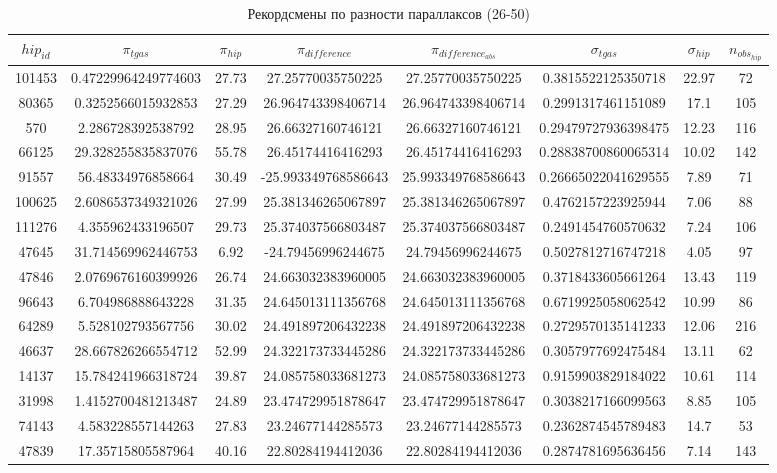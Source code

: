 \documentclass[14pt]{article} %
\begin{document}
\begin{landscape}
\begin{spacing}{1.0}
\begin{table}[h]
\caption{Рекордсмены по разности параллаксов (26-50)}
\label{tabular:75_50}
\begin{tabular}{|c|c|c|c|c|c|c|c|}
\hline 	
$hip_{id}$ &$\pi_{tgas}$ &$\pi_{hip}$ &$\pi_{difference}$ &$\pi_{difference_{abs}}$ &$\sigma_{tgas}$ &$\sigma_{hip}$ &$n_{obs_{hip}}$\\
\hline  
101453&0.47229964249774603&27.73&27.25770035750225&27.25770035750225&0.3815522125350718&22.97&72\\
80365&0.3252566015932853&27.29&26.964743398406714&26.964743398406714&0.2991317461151089&17.1&105\\
570&2.286728392538792&28.95&26.66327160746121&26.66327160746121&0.29479727936398475&12.23&116\\
66125&29.328255835837076&55.78&26.45174416416293&26.45174416416293&0.28838700860065314&10.02&142\\
91557&56.48334976858664&30.49&-25.993349768586643&25.993349768586643&0.26665022041629555&7.89&71\\
100625&2.6086537349321026&27.99&25.381346265067897&25.381346265067897&0.4762157223925944&7.06&88\\
111276&4.355962433196507&29.73&25.374037566803487&25.374037566803487&0.2491454760570632&7.24&106\\
47645&31.714569962446753&6.92&-24.79456996244675&24.79456996244675&0.5027812716747218&4.05&97\\
47846&2.0769676160399926&26.74&24.663032383960005&24.663032383960005&0.3718433605661264&13.43&119\\
96643&6.704986888643228&31.35&24.645013111356768&24.645013111356768&0.6719925058062542&10.99&86\\
64289&5.528102793567756&30.02&24.491897206432238&24.491897206432238&0.2729570135141233&12.06&216\\
46637&28.667826266554712&52.99&24.322173733445286&24.322173733445286&0.3057977692475484&13.11&62\\
14137&15.784241966318724&39.87&24.085758033681273&24.085758033681273&0.9159903829184022&10.61&114\\
31998&1.4152700481213487&24.89&23.474729951878647&23.474729951878647&0.3038217166099563&8.85&105\\
74143&4.583228557144263&27.83&23.24677144285573&23.24677144285573&0.2362874545789483&14.7&53\\
47839&17.35715805587964&40.16&22.80284194412036&22.80284194412036&0.2874781695636456&7.14&143\\

\end{tabular}
\end{table}
\end{spacing}
\end{landscape}
\end{document}
